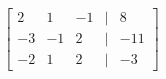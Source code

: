 \documentclass[preview]{standalone}
\begin{document}
\begin{align*}
\begin{bmatrix} 2 & 1 & -1 & | & 8 \\ -3 & -1 & 2 & | & -11 \\ -2 & 1 & 2 & | & -3 \end{bmatrix}\\
\end{align*}
\end{document}
